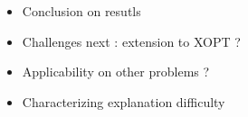 

\begin{itemize}
    \item Conclusion on resutls
    \item Challenges next : extension to XOPT ? 
    \item Applicability on other problems ?
    \item Characterizing explanation difficulty
\end{itemize}
